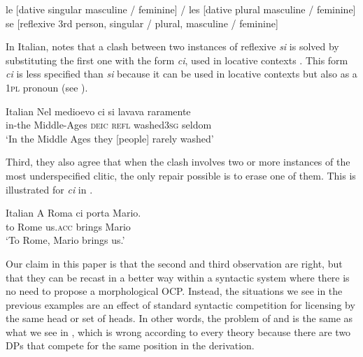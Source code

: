 \documentclass[output=paper,modfonts,nonflat,newtxmath,colorlinks,citecolor=brown]{langsci/langscibook}
\begin{document}
\ea%
    \label{ex:cabre:3}
    \ea le [dative singular masculine / feminine]  / les [dative   plural masculine / feminine]  
    \ex se [reflexive 3rd person, singular / plural, masculine /   feminine]   
    \z
    \z

      
In Italian, \citet{Pescarini2007} notes that a clash between two instances of reflexive \textit{si} is solved by substituting the first one with the form \textit{ci}, used in locative contexts . This form \textit{ci} is less specified than \textit{si} because it can be used in locative contexts but also as a \textsc{1pl} pronoun (see \citealt{Ferrazzano2003}).

\ea%
    \label{ex:cabre:4}
    Italian 
    \ex
    \gll Nel medioevo  ci  si  lavava         raramente \\
    in-the Middle-Ages  \textsc{deic} \textsc{refl}  washed\textsc{3sg} seldom  \\
    \glt  ‘In the Middle Ages they [people] rarely washed’
    \z
    \z

          


 

Third, they also agree that when the clash involves two or more instances of the most underspecified clitic, the only repair possible is to erase one of them. This is illustrated for \textit{ci} in .

\ea%
    \label{ex:cabre:5}
    Italian 
    \ex
    \gll A Roma   ci  porta   Mario.  \\
    to Rome  us.\textsc{acc}  brings  Mario \\
    \glt  ‘To Rome, Mario brings us.’
    \z
    \z
    
Our claim in this paper is that the second and third observation are right, but that they can be recast in a better way within a syntactic system where there is no need to propose a morphological OCP. Instead, the situations we see in the previous examples are an effect of standard syntactic competition for licensing by the same head or set of heads. In other words, the problem of  and  is the same as what we see in , which is wrong according to every theory because there are two DPs that compete for the same position in the derivation.
\end{document}

